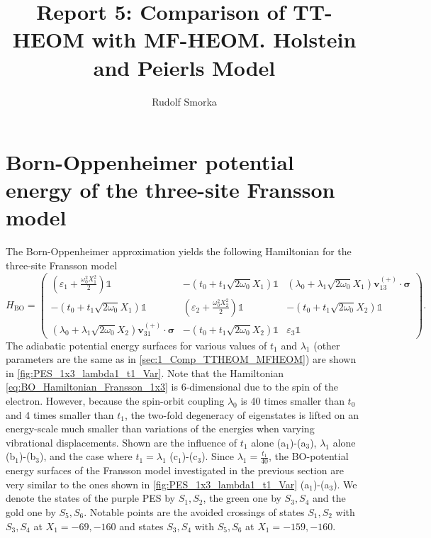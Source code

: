 \documentclass{article}
\renewcommand{\vec}[1]{\mathbf{#1}}
\begin{document}
	
\title{Report 5: Comparison of TT-HEOM with MF-HEOM. Holstein and Peierls Model}
\author{Rudolf Smorka}
\maketitle
\section{Born-Oppenheimer potential energy of the three-site Fransson model}
The Born-Oppenheimer approximation yields the following Hamiltonian for the three-site Fransson model
\begin{equation}
	H_\mathrm{BO} = \begin{pmatrix}
		\left(\varepsilon_1 + \frac{\omega_0^2 X_1^2}{2}\right) \mathds{1} & -(t_0 +t_1\sqrt{2\omega_0}X_1)\mathds{1} & (\lambda_0 + \lambda_1\sqrt{2\omega_0}X_1)\vec{v}_{13}^{(+)}\cdot\bm{\sigma}\\
		-(t_0 +t_1\sqrt{2\omega_0}X_1)\mathds{1} & \left(\varepsilon_2 + \frac{\omega_0^2 X_2^2}{2}\right) \mathds{1} & -(t_0 +t_1\sqrt{2\omega_0}X_2)\mathds{1} \\
		(\lambda_0 + \lambda_1\sqrt{2\omega_0}X_2)\vec{v}_{31}^{(+)}\cdot\bm{\sigma}&  -(t_0 +t_1\sqrt{2\omega_0}X_2)\mathds{1} & \varepsilon_3 \mathds{1}
	\end{pmatrix}.\label{eq:BO_Hamiltonian_Fransson_1x3}
\end{equation}
The adiabatic potential energy surfaces for various values of $t_1$ and $\lambda_1$ (other parameters are the same as in \cref{sec:1_Comp_TTHEOM_MFHEOM}) are shown in \cref{fig:PES_1x3_lambda1_t1_Var}. Note that the Hamiltonian \cref{eq:BO_Hamiltonian_Fransson_1x3} is 6-dimensional due to the spin of the electron. However, because the spin-orbit coupling $\lambda_0$ is 40 times smaller than $t_0$ and 4 times smaller than $t_1$, the two-fold degeneracy of eigenstates is lifted on an energy-scale much smaller than variations of the energies when varying vibrational displacements. Shown are the influence of $t_1$ alone (a$_1$)-(a$_3$), $\lambda_1$ alone (b$_1$)-(b$_3$), and the case where $t_1=\lambda_1$ (c$_1$)-(c$_3$). Since $\lambda_1=\frac{t_1}{40}$, the BO-potential energy surfaces of the Fransson model investigated in the previous section are very similar to the ones shown in \cref{fig:PES_1x3_lambda1_t1_Var} (a$_1$)-(a$_3$). We denote the states of the purple PES by $S_1,S_2$, the green one by $S_3,S_4$ and the gold one by $S_5,S_6$.
Notable points are the avoided crossings of states $S_1,S_2$ with $S_3,S_4$ at $X_1=-69,-160$ and states $S_3,S_4$ with $S_5,S_6$ at $X_1=-159,-160$. 
\end{document}

